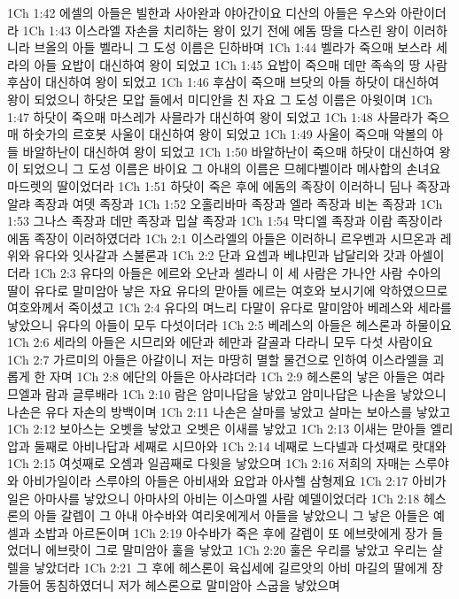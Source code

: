 1Ch 1:42  에셀의 아들은 빌한과 사아완과 야아간이요 디산의 아들은 우스와 아란이더라
1Ch 1:43  이스라엘 자손을 치리하는 왕이 있기 전에 에돔 땅을 다스린 왕이 이러하니라 브올의 아들 벨라니 그 도성 이름은 딘하바며
1Ch 1:44  벨라가 죽으매 보스라 세라의 아들 요밥이 대신하여 왕이 되었고
1Ch 1:45  요밥이 죽으매 데만 족속의 땅 사람 후삼이 대신하여 왕이 되었고
1Ch 1:46  후삼이 죽으매 브닷의 아들 하닷이 대신하여 왕이 되었으니 하닷은 모압 들에서 미디안을 친 자요 그 도성 이름은 아윗이며
1Ch 1:47  하닷이 죽으매 마스레가 사믈라가 대신하여 왕이 되었고
1Ch 1:48  사믈라가 죽으매 하숫가의 르호봇 사울이 대신하여 왕이 되었고
1Ch 1:49  사울이 죽으매 악볼의 아들 바알하난이 대신하여 왕이 되었고
1Ch 1:50  바알하난이 죽으매 하닷이 대신하여 왕이 되었으니 그 도성 이름은 바이요 그 아내의 이름은 므헤다벨이라 메사합의 손녀요 마드렛의 딸이었더라
1Ch 1:51  하닷이 죽은 후에 에돔의 족장이 이러하니 딤나 족장과 알랴 족장과 여뎃 족장과
1Ch 1:52  오홀리바마 족장과 엘라 족장과 비논 족장과
1Ch 1:53  그나스 족장과 데만 족장과 밉살 족장과
1Ch 1:54  막디엘 족장과 이람 족장이라 에돔 족장이 이러하였더라
1Ch 2:1  이스라엘의 아들은 이러하니 르우벤과 시므온과 레위와 유다와 잇사갈과 스불론과
1Ch 2:2  단과 요셉과 베냐민과 납달리와 갓과 아셀이더라
1Ch 2:3  유다의 아들은 에르와 오난과 셀라니 이 세 사람은 가나안 사람 수아의 딸이 유다로 말미암아 낳은 자요 유다의 맏아들 에르는 여호와 보시기에 악하였으므로 여호와께서 죽이셨고
1Ch 2:4  유다의 며느리 다말이 유다로 말미암아 베레스와 세라를 낳았으니 유다의 아들이 모두 다섯이더라
1Ch 2:5  베레스의 아들은 헤스론과 하물이요
1Ch 2:6  세라의 아들은 시므리와 에단과 헤만과 갈골과 다라니 모두 다섯 사람이요
1Ch 2:7  가르미의 아들은 아갈이니 저는 마땅히 멸할 물건으로 인하여 이스라엘을 괴롭게 한 자며
1Ch 2:8  에단의 아들은 아사랴더라
1Ch 2:9  헤스론의 낳은 아들은 여라므엘과 람과 글루배라
1Ch 2:10  람은 암미나답을 낳았고 암미나답은 나손을 낳았으니 나손은 유다 자손의 방백이며
1Ch 2:11  나손은 살마를 낳았고 살마는 보아스를 낳았고
1Ch 2:12  보아스는 오벳을 낳았고 오벳은 이새를 낳았고
1Ch 2:13  이새는 맏아들 엘리압과 둘째로 아비나답과 세째로 시므아와
1Ch 2:14  네째로 느다넬과 다섯째로 랏대와
1Ch 2:15  여섯째로 오셈과 일곱째로 다윗을 낳았으며
1Ch 2:16  저희의 자매는 스루야와 아비가일이라 스루야의 아들은 아비새와 요압과 아사헬 삼형제요
1Ch 2:17  아비가일은 아마사를 낳았으니 아마사의 아비는 이스마엘 사람 예델이었더라
1Ch 2:18  헤스론의 아들 갈렙이 그 아내 아수바와 여리옷에게서 아들을 낳았으니 그 낳은 아들은 예셀과 소밥과 아르돈이며
1Ch 2:19  아수바가 죽은 후에 갈렙이 또 에브랏에게 장가 들었더니 에브랏이 그로 말미암아 훌을 낳았고
1Ch 2:20  훌은 우리를 낳았고 우리는 살렐을 낳았더라
1Ch 2:21  그 후에 헤스론이 육십세에 길르앗의 아비 마길의 딸에게 장가들어 동침하였더니 저가 헤스론으로 말미암아 스굽을 낳았으며
